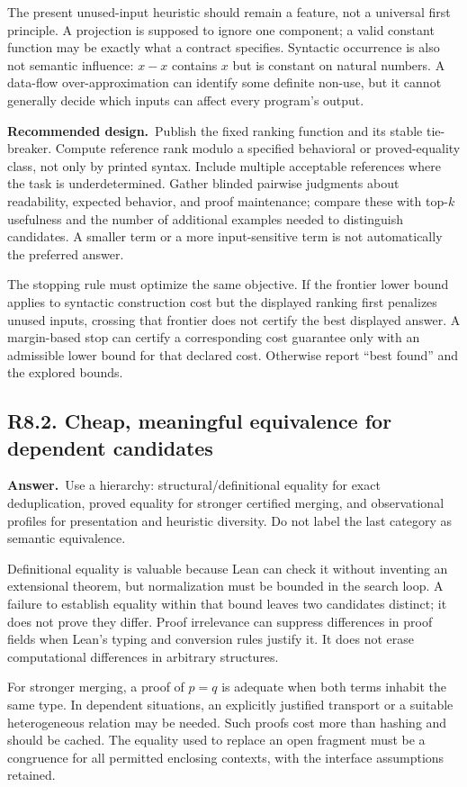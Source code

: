 \documentclass[11pt,a4paper]{article}
\newcommand{\qid}[3]{\subsection{#2. #3}\label{#1}}
\newcommand{\answer}{\noindent\textbf{Answer.}\ }
\newcommand{\proposal}{\noindent\textbf{Recommended design.}\ }
\theoremstyle{remark}
\begin{document}
The present unused-input heuristic should remain a feature, not a universal first principle. A projection is supposed to ignore one component; a valid constant function may be exactly what a contract specifies. Syntactic occurrence is also not semantic influence: $x-x$ contains $x$ but is constant on natural numbers. A data-flow over-approximation can identify some definite non-use, but it cannot generally decide which inputs can affect every program's output.

\proposal Publish the fixed ranking function and its stable tie-breaker. Compute reference rank modulo a specified behavioral or proved-equality class, not only by printed syntax. Include multiple acceptable references where the task is underdetermined. Gather blinded pairwise judgments about readability, expected behavior, and proof maintenance; compare these with top-$k$ usefulness and the number of additional examples needed to distinguish candidates. A smaller term or a more input-sensitive term is not automatically the preferred answer.

The stopping rule must optimize the same objective. If the frontier lower bound applies to syntactic construction cost but the displayed ranking first penalizes unused inputs, crossing that frontier does not certify the best displayed answer. A margin-based stop can certify a corresponding cost guarantee only with an admissible lower bound for that declared cost. Otherwise report ``best found'' and the explored bounds.

\qid{q82}{R8.2}{Cheap, meaningful equivalence for dependent candidates}
\answer Use a hierarchy: structural/definitional equality for exact deduplication, proved equality for stronger certified merging, and observational profiles for presentation and heuristic diversity. Do not label the last category as semantic equivalence.

Definitional equality is valuable because Lean can check it without inventing an extensional theorem, but normalization must be bounded in the search loop. A failure to establish equality within that bound leaves two candidates distinct; it does not prove they differ. Proof irrelevance can suppress differences in proof fields when Lean's typing and conversion rules justify it. It does not erase computational differences in arbitrary structures.

For stronger merging, a proof of $p=q$ is adequate when both terms inhabit the same type. In dependent situations, an explicitly justified transport or a suitable heterogeneous relation may be needed. Such proofs cost more than hashing and should be cached. The equality used to replace an open fragment must be a congruence for all permitted enclosing contexts, with the interface assumptions retained.
\end{document}
